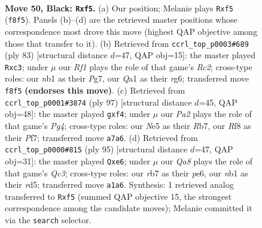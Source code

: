 \documentclass[11pt]{article}
\begin{document}
\clearpage

\begin{figure}[p]\centering
\begin{subfigure}{0.46\textwidth}\centering
\resizebox{\linewidth}{!}{%
\newchessgame
\chessboard[
  setfen={3k1r2/pR5p/8/4nP2/1p1p4/8/4P3/qNK5 b - - 0 50},
  showmover=false,
  pgfstyle=straightmove, color=movearrow, markmove={f8-f5}
]}
\caption{}
\end{subfigure}\hfill
\begin{subfigure}{0.46\textwidth}\centering
\resizebox{\linewidth}{!}{%
\newchessgame
\chessboard[
  setfen={6k1/2r3p1/p5R1/1p1p3P/8/2P5/P7/3K4 b - - 1 42},
  showmover=false,
  pgfstyle=straightmove, color=movearrow, markmove={c7-c3}
]}
\caption{}
\end{subfigure}
\\[4pt]
\begin{subfigure}{0.46\textwidth}\centering
\resizebox{\linewidth}{!}{%
\newchessgame
\chessboard[
  setfen={8/1r3p2/Nn6/pR4p1/P2k1P2/8/5K2/8 b - - 5 49},
  showmover=false,
  pgfstyle=straightmove, color=movearrow, markmove={g5-f4}
]}
\caption{}
\end{subfigure}\hfill
\begin{subfigure}{0.46\textwidth}\centering
\resizebox{\linewidth}{!}{%
\newchessgame
\chessboard[
  setfen={8/7k/1pq1P3/1p1R2p1/1P6/4NKPP/8/8 b - - 5 48},
  showmover=false,
  pgfstyle=straightmove, color=movearrow, markmove={c6-e6}
]}
\caption{}
\end{subfigure}
\caption{\textbf{Move 50, Black: \texttt{Rxf5}.} (a) Our position; Melanie plays \texttt{Rxf5} (\texttt{f8f5}). Panels (b)--(d) are the retrieved master positions whose correspondence most drove this move (highest QAP objective among those that transfer to it). (b) Retrieved from \texttt{ccrl\_top\_p0003\#689} (ply 83) [structural distance $d$=47, QAP obj=15]: the master played \texttt{Rxc3}; under $\mu$ our \emph{Rf1} plays the role of that game's \emph{Rc2}; cross-type roles: our \emph{n}b1 as their \emph{P}g7, our \emph{Q}a1 as their \emph{r}g6; transferred move \texttt{f8f5} \textbf{(endorses this move)}. (c) Retrieved from \texttt{ccrl\_top\_p0001\#3874} (ply 97) [structural distance $d$=45, QAP obj=48]: the master played \texttt{gxf4}; under $\mu$ our \emph{Pa2} plays the role of that game's \emph{Pg4}; cross-type roles: our \emph{N}e5 as their \emph{R}b7, our \emph{R}f8 as their \emph{P}f7; transferred move \texttt{a7a6}. (d) Retrieved from \texttt{ccrl\_top\_p0000\#815} (ply 95) [structural distance $d$=47, QAP obj=31]: the master played \texttt{Qxe6}; under $\mu$ our \emph{Qa8} plays the role of that game's \emph{Qc3}; cross-type roles: our \emph{r}b7 as their \emph{p}e6, our \emph{n}b1 as their \emph{r}d5; transferred move \texttt{a1a6}. Synthesis: 1 retrieved analog transferred to \texttt{Rxf5} (summed QAP objective 15, the strongest correspondence among the candidate moves); Melanie committed it via the \texttt{search} selector.}
\label{fig:thought-m99}
\end{figure}
\end{document}
